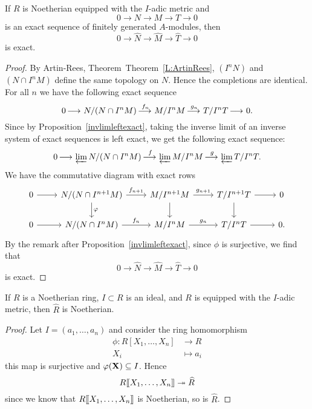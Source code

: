 \documentclass{ximera}
\begin{document}
\begin{proposition}\label{P:compexact}
  If $R$ is Noetherian equipped with the $I$-adic metric and
  \[
  0\to N \to M \to T \to 0
  \]
  is an exact sequence of finitely generated $A$-modules, then 
  \[
  0\to \hat{N} \to \hat{M} \to \hat{T} \to 0
  \]
  is exact.
  \begin{proof}
    By Artin-Rees,
    Theorem~Theorem~\ref{L:ArtinRees}, $(I^n N)$ and
    $(N \cap I^n M)$ define the same topology on $N$.  Hence the
    completions are identical.  For all $n$ we have the following
    exact sequence
    \[
    0 \mathop{\longrightarrow\,}\limits N / (N \cap I^n M) \mathop{\longrightarrow\,}\limits^{f_n} M / I^n M \mathop{\longrightarrow\,}\limits^{g_n} T / I^n T \mathop{\longrightarrow\,}\limits
    0.
    \]
    Since by Proposition~\ref{invlimleftexact}, taking the inverse
    limit of an inverse system of exact sequences is left exact, we
    get the following exact sequence:
    \[
    0 \mathop{\longrightarrow\,}\limits \varprojlim N/(N \cap I^nM) \mathop{\longrightarrow\,}\limits^{f} \varprojlim M/I^nM \mathop{\longrightarrow\,}\limits^{g} \varprojlim T/I^nT.
    \]
    We have the commutative diagram with exact rows
    \[
    \begin{tikzcd}
      0 \ar[r] & N/(N \cap I^{n+1}M) \ar[d,"\phi"] \ar[r,"f_{n+1}"] & M/I^{n+1}M \ar[d] \ar[r,"g_{n+1}"] & T/I^{n+1}T \ar[r] \ar[d] & 0 \\
      0 \ar[r] & N/(N \cap I^nM) \ar[r,"f_n"] & M/I^nM \ar[r,"g_n"] & T/I^nT \ar[r] & 0. 
    \end{tikzcd}
    \]
    By the remark after Proposition~\ref{invlimleftexact}, since
    $\phi$ is surjective, we find that
    \[
    0\to \hat{N} \to \hat{M} \to \hat{T} \to 0
    \]
    is exact.
\end{proof}
\end{proposition}


\begin{corollary}
  If $R$ is a Noetherian ring, $I\subset R$ is an ideal, and $R$ is
  equipped with the $I$-adic metric, then $\hat{R}$ is Noetherian.
  \begin{proof}
    Let $I = (a_1,\dots,a_n)$ and consider the ring homomorphism
    \begin{align*}
      \phi:R[X_1,\dots, X_n] &\to R \\
      X_i &\mapsto a_i
    \end{align*}
    this map is surjective and $\varphi(\mathbf X) \subseteq I$. Hence
    \[
    R[\hspace{-0.25ex}[ X_1,\dots, X_n]\hspace{-0.25ex}] \twoheadrightarrow \widehat{R}
    \]
    since we know that $R[\hspace{-0.25ex}[ X_1,\dots, X_n]\hspace{-0.25ex}]$ is Noetherian, so is
    $\hat{R}$.
  \end{proof}
\end{corollary}
\end{document}
